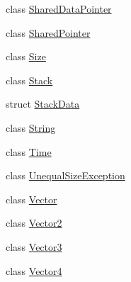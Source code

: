 \begin{DoxyCompactItemize}
\item 
class \hyperlink{classprism_1_1_shared_data_pointer}{Shared\+Data\+Pointer}
\item 
class \hyperlink{classprism_1_1_shared_pointer}{Shared\+Pointer}
\item 
class \hyperlink{classprism_1_1_size}{Size}
\item 
class \hyperlink{classprism_1_1_stack}{Stack}
\item 
struct \hyperlink{structprism_1_1_stack_data}{Stack\+Data}
\item 
class \hyperlink{classprism_1_1_string}{String}
\item 
class \hyperlink{classprism_1_1_time}{Time}
\item 
class \hyperlink{classprism_1_1_unequal_size_exception}{Unequal\+Size\+Exception}
\item 
class \hyperlink{classprism_1_1_vector}{Vector}
\item 
class \hyperlink{classprism_1_1_vector2}{Vector2}
\item 
class \hyperlink{classprism_1_1_vector3}{Vector3}
\item 
class \hyperlink{classprism_1_1_vector4}{Vector4}
\end{DoxyCompactItemize}
